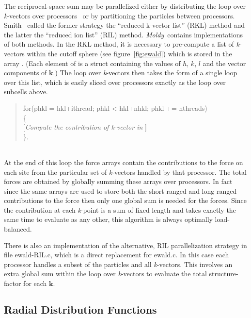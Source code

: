 \documentclass[a4paper,twoside]{report}
\newcommand{\Fname}[1]{{\upshape\mdseries\sffamily#1}}
\newcommand{\Litf}{\ttfamily\upshape\mdseries}
\newcommand{\bm}[1]{\mathbf{#1}}
\newcommand{\moldy}{\emph{Moldy}}
\begin{document}
The reciprocal-space sum may be parallelized either by distributing
the loop over \emph{k}-vectors over
processors~\cite{clementi:85,smith:92} or by partitioning the
particles between processors. Smith~\cite{smith:92} called the former
strategy the ``reduced k-vector list'' (RKL) method and the latter the
``reduced ion list'' (RIL) method.  \moldy\ contains implementations
of both methods.  In the RKL method, it is necessary to pre-compute a
list of \emph{k}-vectors within the cutoff sphere (see
figure~\ref{fig:ewald}) which is stored in the array .
(Each element of  is a struct containing the values of $h$,
$k$, $l$ and the vector components of $\bm{k}$.) The loop over
\emph{k}-vectors then takes the form of a single loop over this list,
which is easily sliced over processors exactly as the loop over
subcells above.\\
\parbox{\textwidth}{%
\begin{quote}
  \Litf
   for(phkl = hkl+ithread; phkl < hkl+nhkl; phkl += nthreads)\\
   \{\\
\hspace*{1cm}\textnormal{[\emph{Compute the contribution of
   \emph{k}-vector in} ]}\\
   \}.
\end{quote}}\\
At the end of this loop the force arrays contain the contributions to
the force on each site from the particular set of \emph{k}-vectors
handled by that processor.  The total forces are obtained by globally
summing these arrays over processors.  In fact since the same arrays are
used to store both the short-ranged and long-ranged contributions to
the force then only one global sum is needed for the forces.  Since
the contribution at each \emph{k}-point is a sum of fixed length and
takes exactly the same time to evaluate as any other, this algorithm
is always optimally load-balanced.

There is also an implementation of the alternative, RIL
parallelization strategy in file \Fname{ewald-RIL.c}, which is a direct
replacement for \Fname{ewald.c}.  In this case each processor handles a
subset of the particles and all \emph{k}-vectors.  This involves an
extra global sum within the loop over \emph{k}-vectors to evaluate
the total structure-factor for each $\bm{k}$.  

\subsection{Radial Distribution Functions}
\end{document}
